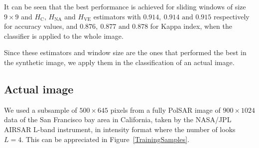\documentclass[journal]{IEEEtran}
\begin{document}

It can be seen that the best performance is achieved for sliding windows of size $9 \times 9$ and $H_\text{C}$, $H_{\text{NA}}$ and $H_{\text{VE}}$ estimators with $0.914, \ 0.914 \text{ and } 0.915$ respectively for accuracy values,  and  $0.876, \ 0.877 \text{ and } 0.878$ for Kappa index, when the classifier is applied to the whole image.

Since these estimators and window size are the ones that performed the best in the synthetic image, we apply them in the classification of an actual image.

\subsection{Actual image}

We used a subsample of $500 \times 645$ pixels from a fully PolSAR image of $900 \times 1024$ data of the San Francisco bay area in California, taken by the NASA/JPL AIRSAR L-band instrument, in intensity format where the number of looks $L=4$. This can be appreciated in Figure~\ref{TrainingSamples}.
\end{document}
